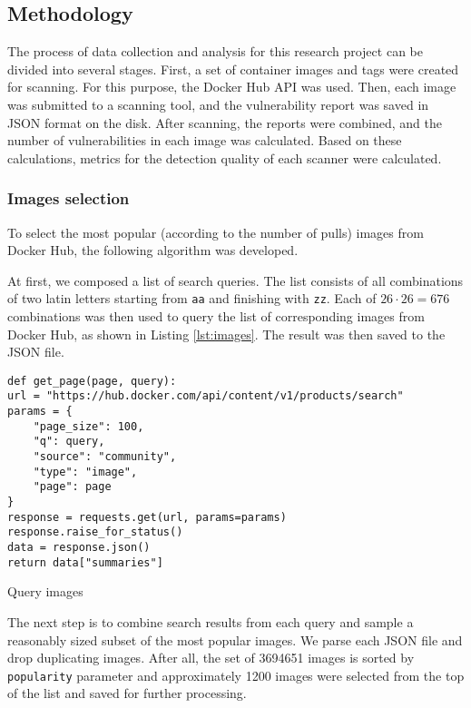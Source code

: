 \clearpage
\subsection{Methodology}

The process of data collection and analysis for this research project can be divided into several stages. First, a set of container images and tags were created for scanning. For this purpose, the Docker Hub API was used. Then, each image was submitted to a scanning tool, and the vulnerability report was saved in JSON format on the disk. After scanning, the reports were combined, and the number of vulnerabilities in each image was calculated. Based on these calculations, metrics for the detection quality of each scanner were calculated.

\subsubsection{Images selection}

To select the most popular (according to the number of pulls) images from Docker Hub, the following algorithm was developed.

At first, we composed a list of search queries. The list consists of all combinations of two latin letters starting from \texttt{aa} and finishing with \texttt{zz}. Each of $26 \cdot 26 = 676$ combinations was then used to query the list of corresponding images from Docker Hub, as shown in Listing \ref{lst:images}. The result was then saved to the JSON file.
\begin{listing}[htp]
    \centering
    \begin{minipage}{0.8\linewidth}
        \begin{verbatim}
def get_page(page, query):
url = "https://hub.docker.com/api/content/v1/products/search"
params = {
    "page_size": 100,
    "q": query,
    "source": "community",
    "type": "image",
    "page": page
}
response = requests.get(url, params=params)
response.raise_for_status()
data = response.json()
return data["summaries"]
        \end{verbatim}
    \end{minipage}
    \caption{Query images}
    \label{lst:images}
\end{listing}

The next step is to combine search results from each query and sample a reasonably sized subset of the most popular images. We parse each JSON file and drop duplicating images. After all, the set of 3694651 images is sorted by \texttt{popularity} parameter and approximately 1200 images were selected from the top of the list and saved for further processing.

